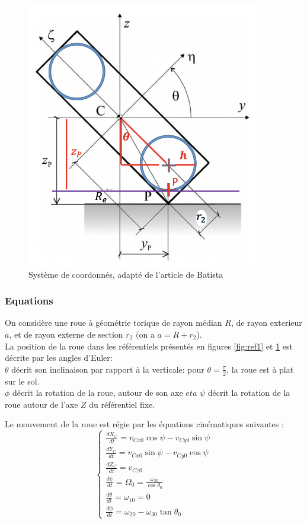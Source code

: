 \begin{figure}[htb]
\centering
\includegraphics[width=4in]{batista/ref2.png}
\caption{Système de coordonnés, adapté de l'article de Batista \cite{Batista}}
\label{fig:ref2}
\end{figure}

\subsubsection{Equations}
On considère une roue à géométrie torique de rayon médian $R$, de rayon exterieur $a$, et de rayon externe de section $r_2$ (on a $a=R+r_2$).\\
La position de la roue dans les référentiels présentés en figures \ref{fig:ref1} et \ref{fig:ref2} est décrite par les angles d'Euler: \\
$\theta$ décrit son inclinaison par rapport à la verticale: pour $\theta=\frac{\pi}{2}$, la roue est à plat sur le sol. \\
$\phi$ décrit la rotation de la roue, autour de son axe $eta$
$\psi$ décrit la rotation de la roue autour de l'axe $Z$ du référentiel fixe.

Le mouvement de la roue est régie par les équations cinématiques suivantes \cite{Batista}:
\begin{equation}
  \begin{cases}
    \frac{dX_C}{dt}=v_{Cx0} \cos{\psi}- v_{Cy0} \sin{\psi}\\
    \frac{dY_C}{dt}=v_{Cx0} \sin{\psi}- v_{Cy0} \cos{\psi}\\
    \frac{dZ_C}{dt}=v_{Cz0} \\
    \frac{d\psi}{dt}=\Omega_0=\frac{\omega_{30}}{\cos{\theta_0}}\\
    \frac{d\theta}{dt}=\omega_{10}=0\\
    \frac{d\phi}{dt}=\omega_{20}-\omega_{30} \tan{\theta_0}
  \end{cases}
  \label{eq:b1}
\end{equation}


